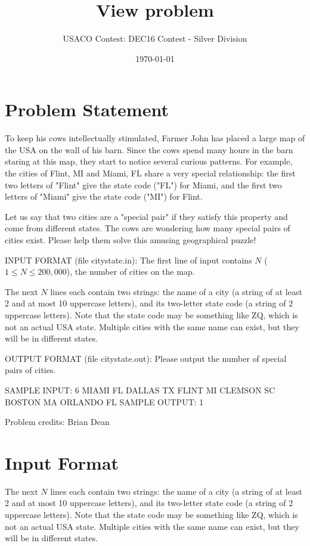 \documentclass[12pt]{article}
\title{View problem}
\author{USACO Contest: DEC16 Contest - Silver Division}
\date{\today}
\begin{document}
\maketitle

\section*{Problem Statement}

To keep his cows intellectually stimulated, Farmer John has placed a large map
of the USA on the wall of his barn.  Since the cows spend many hours in the barn
staring at this map, they start to notice several curious patterns.  For
example, the cities of Flint, MI and  Miami, FL share a very special
relationship: the first two letters of "Flint" give the  state code ("FL") for
Miami, and the first two letters of "Miami" give the state code ("MI")  for
Flint. 

Let us say that two cities are a "special pair" if they satisfy this property
and come  from different states.  The cows are wondering how many special pairs
of cities exist. Please help them solve this amusing geographical puzzle!

INPUT FORMAT (file citystate.in):
The first line of input contains $N$ ($1 \leq N \leq 200,000$), the number of
cities on the map.

The next $N$ lines each contain two strings: the name of a city (a string of at
least 2 and at most 10 uppercase letters), and its two-letter state code (a
string of 2 uppercase letters).  Note that the state code may be something like
ZQ, which is not an actual USA state.  Multiple cities with the same name can
exist, but they will be in different states.

OUTPUT FORMAT (file citystate.out):
Please output the number of special pairs of cities.

SAMPLE INPUT:
6
MIAMI FL
DALLAS TX
FLINT MI
CLEMSON SC
BOSTON MA
ORLANDO FL
SAMPLE OUTPUT: 
1

Problem credits: Brian Dean



\section*{Input Format}
The next $N$ lines each contain two strings: the name of a city (a string of at
least 2 and at most 10 uppercase letters), and its two-letter state code (a
string of 2 uppercase letters).  Note that the state code may be something like
ZQ, which is not an actual USA state.  Multiple cities with the same name can
exist, but they will be in different states.
\end{document}
